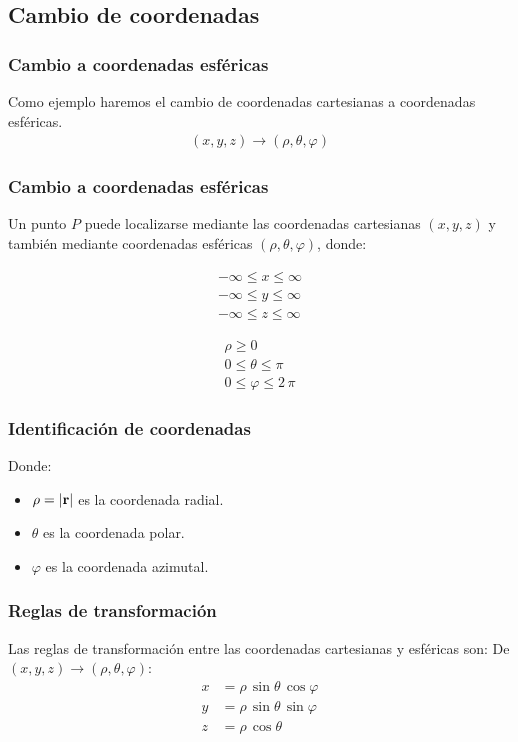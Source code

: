 \documentclass[12pt]{beamer}
\begin{document}
\subsection{Cambio de coordenadas}

\begin{frame}
\frametitle{Cambio a coordenadas esféricas}
Como ejemplo haremos el cambio de coordenadas cartesianas a coordenadas esféricas.
\begin{align*}
(x, y, z) \longrightarrow (\rho, \theta, \varphi)
\end{align*}
\end{frame}
\begin{frame}
\frametitle{Cambio a coordenadas esféricas}
Un punto $P$ puede localizarse mediante las coordenadas cartesianas $(x, y, z)$ y también mediante coordenadas esféricas $(\rho, \theta, \varphi)$, donde:
\pause
\begin{minipage}{0.4\linewidth}
\begin{align*}
-\infty \le x \le \infty \\
-\infty \le y \le \infty \\
-\infty \le z \le \infty
\end{align*}
\end{minipage}
\hspace{0.3cm}
\begin{minipage}{0.4\linewidth}
\begin{align*}
\rho \geq 0 \\
0 \le \theta \le \pi \\
0 \le \varphi \le 2 \, \pi
\end{align*}
\end{minipage}
\end{frame}
\begin{frame}
\frametitle{Identificación de coordenadas}
Donde:
\pause
\begin{itemize}
\item[\ding{212}] $\rho = \abs{\vb{r}}$ es la coordenada radial.
\item[\ding{212}] $\theta$ es la coordenada polar.
\item[\ding{212}] $\varphi$ es la coordenada azimutal.
\end{itemize}
\end{frame}
\begin{frame}
\frametitle{Reglas de transformación}
Las reglas de transformación entre las coordenadas cartesianas y esféricas son:
\pause
De $(x, y, z) \rightarrow (\rho, \theta, \varphi)$:
\begin{align*}
x &= \rho \, \sin \theta \, \cos \varphi \\
y &= \rho \, \sin \theta \, \sin \varphi \\
z &= \rho \, \cos \theta
\end{align*}
\end{frame}
\end{document}
